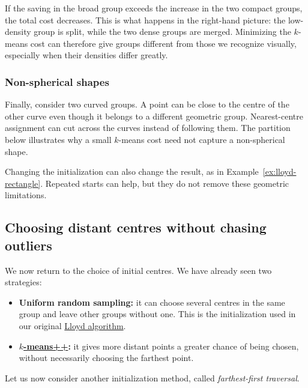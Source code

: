 \documentclass[a4paper,12pt,oneside]{report}
\begin{document}
If the saving in the broad group exceeds the increase in the two
compact groups, the total cost decreases. This is what happens in
the right-hand picture: the low-density group is split, while the
two dense groups are merged. Minimizing the $k$-means cost can
therefore give groups different from those we recognize visually,
especially when their densities differ greatly.
\begin{center}

\end{center}

\subsubsection{Non-spherical shapes}

Finally, consider two curved groups. A point can be close to the
centre of the other curve even though it belongs to a different
geometric group. Nearest-centre assignment can cut across the
curves instead of following them. The partition below illustrates
why a small $k$-means cost need not capture a non-spherical shape.
\begin{center}

\end{center}

Changing the initialization can also change the result, as in
Example~\ref{ex:lloyd-rectangle}. Repeated starts can help, but they
do not remove these geometric limitations.

\subsection{Choosing distant centres without chasing outliers}
\label{sec:farthest-first}

We now return to the choice of initial centres. We have already
seen two strategies:
\begin{itemize}
  \item \textbf{Uniform random sampling:} it can choose several
    centres in the same group and leave other groups without one.
    This is the initialization used in our original
    \hyperref[alg:lloyd]{Lloyd algorithm}.
  \item \textbf{\hyperref[alg:kmeanspp]{$k$-means++}:} it gives more distant points a greater
    chance of being chosen, without necessarily choosing the
    farthest point.
\end{itemize}

Let us now consider another initialization method, called
\emph{farthest-first traversal}.
\end{document}
